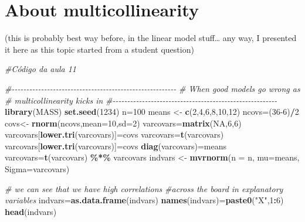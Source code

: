 \documentclass[
]{book}
\newenvironment{Shaded}{\begin{snugshade}}{\end{snugshade}}
\newcommand{\AttributeTok}[1]{\textcolor[rgb]{0.13,0.29,0.53}{#1}}
\newcommand{\CommentTok}[1]{\textcolor[rgb]{0.56,0.35,0.01}{\textit{#1}}}
\newcommand{\ConstantTok}[1]{\textcolor[rgb]{0.56,0.35,0.01}{#1}}
\newcommand{\DecValTok}[1]{\textcolor[rgb]{0.00,0.00,0.81}{#1}}
\newcommand{\FunctionTok}[1]{\textcolor[rgb]{0.13,0.29,0.53}{\textbf{#1}}}
\newcommand{\NormalTok}[1]{#1}
\newcommand{\OtherTok}[1]{\textcolor[rgb]{0.56,0.35,0.01}{#1}}
\newcommand{\SpecialCharTok}[1]{\textcolor[rgb]{0.81,0.36,0.00}{\textbf{#1}}}
\newcommand{\StringTok}[1]{\textcolor[rgb]{0.31,0.60,0.02}{#1}}
\begin{document}
\section{About multicollinearity}\label{about-multicollinearity}

(this is probably best way before, in the linear model stuff\ldots{} any way, I presented it here as this topic started from a student question)

\begin{Shaded}
\begin{Highlighting}[]
\CommentTok{\#Código da aula 11}

\CommentTok{\#{-}{-}{-}{-}{-}{-}{-}{-}{-}{-}{-}{-}{-}{-}{-}{-}{-}{-}{-}{-}{-}{-}{-}{-}{-}{-}{-}{-}{-}{-}{-}{-}{-}{-}{-}{-}{-}{-}{-}{-}{-}{-}{-}{-}{-}{-}{-}{-}{-}{-}{-}{-}{-}{-}{-}{-}}
\CommentTok{\# When good models go wrong as }
\CommentTok{\# multicollinearity kicks in}
\CommentTok{\#{-}{-}{-}{-}{-}{-}{-}{-}{-}{-}{-}{-}{-}{-}{-}{-}{-}{-}{-}{-}{-}{-}{-}{-}{-}{-}{-}{-}{-}{-}{-}{-}{-}{-}{-}{-}{-}{-}{-}{-}{-}{-}{-}{-}{-}{-}{-}{-}{-}{-}{-}{-}{-}{-}{-}{-}}
\FunctionTok{library}\NormalTok{(MASS)}
\FunctionTok{set.seed}\NormalTok{(}\DecValTok{1234}\NormalTok{)}
\NormalTok{n}\OtherTok{=}\DecValTok{100}
\NormalTok{means }\OtherTok{\textless{}{-}} \FunctionTok{c}\NormalTok{(}\DecValTok{2}\NormalTok{,}\DecValTok{4}\NormalTok{,}\DecValTok{6}\NormalTok{,}\DecValTok{8}\NormalTok{,}\DecValTok{10}\NormalTok{,}\DecValTok{12}\NormalTok{)}
\NormalTok{ncovs}\OtherTok{=}\NormalTok{(}\DecValTok{36{-}6}\NormalTok{)}\SpecialCharTok{/}\DecValTok{2}
\NormalTok{covs}\OtherTok{\textless{}{-}} \FunctionTok{rnorm}\NormalTok{(ncovs,}\AttributeTok{mean=}\DecValTok{10}\NormalTok{,}\AttributeTok{sd=}\DecValTok{2}\NormalTok{)}
\NormalTok{varcovars}\OtherTok{=}\FunctionTok{matrix}\NormalTok{(}\ConstantTok{NA}\NormalTok{,}\DecValTok{6}\NormalTok{,}\DecValTok{6}\NormalTok{)}
\NormalTok{varcovars[}\FunctionTok{lower.tri}\NormalTok{(varcovars)]}\OtherTok{=}\NormalTok{covs}
\NormalTok{varcovars}\OtherTok{=}\FunctionTok{t}\NormalTok{(varcovars)}
\NormalTok{varcovars[}\FunctionTok{lower.tri}\NormalTok{(varcovars)]}\OtherTok{=}\NormalTok{covs}
\FunctionTok{diag}\NormalTok{(varcovars)}\OtherTok{=}\NormalTok{means}
\NormalTok{varcovars}\OtherTok{=}\FunctionTok{t}\NormalTok{(varcovars) }\SpecialCharTok{\%*\%}\NormalTok{ varcovars}
\NormalTok{indvars }\OtherTok{\textless{}{-}} \FunctionTok{mvrnorm}\NormalTok{(}\AttributeTok{n =}\NormalTok{ n, }\AttributeTok{mu=}\NormalTok{means, }\AttributeTok{Sigma=}\NormalTok{varcovars)}

\CommentTok{\# we can see that we have high correlations }
\CommentTok{\#across the board in explanatory variables}
\NormalTok{indvars}\OtherTok{=}\FunctionTok{as.data.frame}\NormalTok{(indvars)}
\FunctionTok{names}\NormalTok{(indvars)}\OtherTok{=}\FunctionTok{paste0}\NormalTok{(}\StringTok{"X"}\NormalTok{,}\DecValTok{1}\SpecialCharTok{:}\DecValTok{6}\NormalTok{)}
\FunctionTok{head}\NormalTok{(indvars)}
\end{Highlighting}
\end{Shaded}
\end{document}
